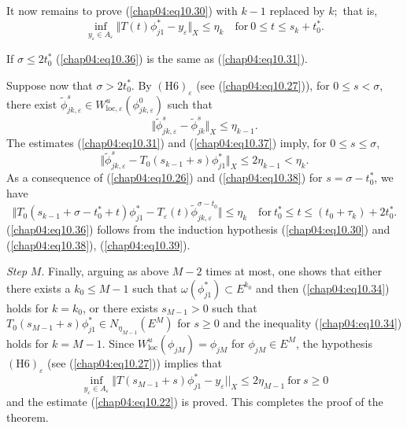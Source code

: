 \documentclass{surv-l}
\theoremstyle{plain}
\theoremstyle{definition}
\numberwithin{equation}{section}
\numberwithin{figure}{chapter}
\begin{document}
It now remains to prove (\ref{chap04:eq10.30}) with $k-1$ replaced by $k;$ that is,
\begin{equation}\label{chap04:eq10.36}
\inf_{y_{\varepsilon}\in A_{\varepsilon}}\Vert T(t)\phi_{j1}^{\ast}-y_{\varepsilon}\Vert_{X}\leq\eta_{k}\quad\mathrm{for}\ 0\leq t\leq s_{k}+t_{0}^{\ast}.
\end{equation}

If $\sigma\leq 2t_{0}^{\ast}$ (\ref{chap04:eq10.36}) is the same as (\ref{chap04:eq10.31}).

Suppose now that $\sigma>2t_{0}^{\ast}$. By $\mathrm{(H6)}_{\varepsilon}$ (see (\ref{chap04:eq10.27})), for $ 0\leq s<\sigma$, there exist $\tilde{\phi}_{jk,\varepsilon}^{s}\in W_{\mathrm{loc},\varepsilon}^{u}(\phi_{jk,\varepsilon}^{0})$ such that
\begin{equation}\label{chap04:eq10.37}
\Vert\tilde{\phi}_{jk,\varepsilon}^{s}-\tilde{\phi}_{jk}^{s}\Vert_X\leq\eta_{k-1}.
\end{equation}
The estimates (\ref{chap04:eq10.31}) and (\ref{chap04:eq10.37}) imply, for $ 0\leq s\leq\sigma$,
\begin{equation}\label{chap04:eq10.38}
\Vert\tilde{\phi}_{j{k,\varepsilon}}^{s}-T_{0}(s_{k-1}+s)\phi_{j{1}}^{\ast}\Vert_{X}\leq 2\eta_{k-1}<\eta_{k}.
\end{equation}
As a consequence of (\ref{chap04:eq10.26}) and (\ref{chap04:eq10.38}) for $s=\sigma-t_{0}^{\ast}$, we have
\begin{equation}\label{chap04:eq10.39}
\Vert T_{0}(s_{k-1}+ \sigma-t_{0}^{\ast}+t)\phi_{j{1}}^{\ast} -T_{\varepsilon}(t)\tilde{\phi}_{jk,\varepsilon}^{\sigma-t_{0}}\Vert\leq\eta_{k}\quad\mathrm{for}\ t_{0}^{\ast}\leq t\leq(t_{0}+\tau_{k})+2t_{0}^{\ast}.
\end{equation}
(\ref{chap04:eq10.36}) follows from the induction hypothesis (\ref{chap04:eq10.30}) and (\ref{chap04:eq10.38}), (\ref{chap04:eq10.39}).

\emph{Step} $M$. Finally, arguing as above $M-2$ times at most, one shows that either there exists a $k_{0}\leq M-1$ such that $\omega(\phi_{j1}^{\ast})\subset E^{k_{0}}$ and then (\ref{chap04:eq10.34}) holds for $k=k_{0}$, or there exists $s_{M-1}>0$ such that $T_{0}(s_{M-1}+s)\phi_{j1}^{\ast}\in N_{\eta_{M-1}}(E^{M})$ for $s \geq 0$ and the inequality (\ref{chap04:eq10.34}) holds for $k=M-1$. Since $W_{\mathrm{loc}}^{u}(\phi_{jM})=\phi_{jM}$ for $\phi_{jM}\in E^{M}$, the hypothesis $\mathrm{(H6)}_{\varepsilon}$ (see (\ref{chap04:eq10.27})) implies that
\begin{equation*}
\inf_{y_{\varepsilon}\in A_{\varepsilon}}\Vert T(s_{M-1}+s)\phi_{j1}^{\ast}-y_{\varepsilon}||_{X}\leq 2\eta_{M-1}\ \mathrm{for}\ s\geq 0
\end{equation*}
and the estimate (\ref{chap04:eq10.22}) is proved. This completes the proof of the theorem.
\end{document}
